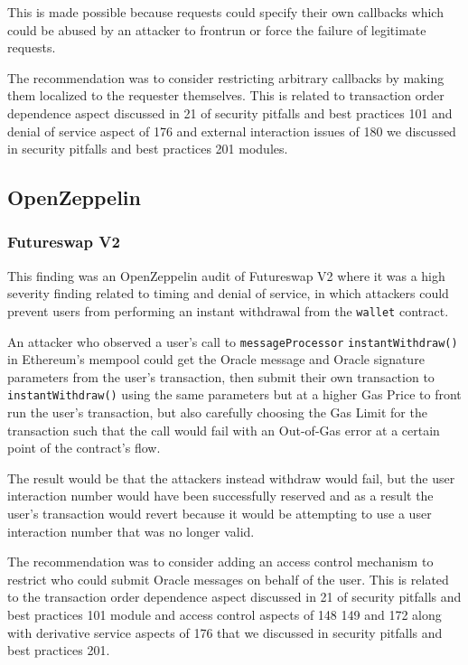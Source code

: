 This is made possible because requests could specify their own callbacks
which could be abused by an attacker to frontrun or force the failure of
legitimate requests.

The recommendation was to consider restricting arbitrary callbacks by
making them localized to the requester themselves. This is related to
transaction order dependence aspect discussed in 21 of security pitfalls
and best practices 101 and denial of service aspect of 176 and external
interaction issues of 180 we discussed in security pitfalls and best
practices 201 modules.

\subsection{OpenZeppelin}\label{openzeppelin}

\subsubsection{Futureswap V2}\label{futureswap-v2}

This finding was an OpenZeppelin audit of Futureswap V2 where it was a
high severity finding related to timing and denial of service, in which
attackers could prevent users from performing an instant withdrawal from
the \texttt{wallet} contract.

An attacker who observed a user's call to \texttt{messageProcessor}
\texttt{instantWithdraw()} in Ethereum's mempool could get the Oracle
message and Oracle signature parameters from the user's transaction,
then submit their own transaction to \texttt{instantWithdraw()} using
the same parameters but at a higher Gas Price to front run the user's
transaction, but also carefully choosing the Gas Limit for the
transaction such that the call would fail with an Out-of-Gas error at a
certain point of the contract's flow.

The result would be that the attackers instead withdraw would fail, but
the user interaction number would have been successfully reserved and as
a result the user's transaction would revert because it would be
attempting to use a user interaction number that was no longer valid.

The recommendation was to consider adding an access control mechanism to
restrict who could submit Oracle messages on behalf of the user. This is
related to the transaction order dependence aspect discussed in 21 of
security pitfalls and best practices 101 module and access control
aspects of 148 149 and 172 along with derivative service aspects of 176
that we discussed in security pitfalls and best practices 201.

